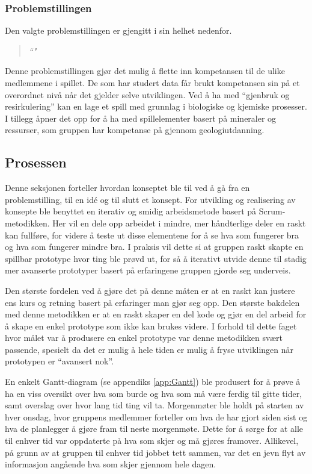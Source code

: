\subsubsection{Problemstillingen}
Den valgte problemstillingen er gjengitt i sin helhet nedenfor.
\begin{quotation}
\large\emph{``"}
\end{quotation}
Denne problemstillingen gjør det mulig å flette inn kompetansen til de
ulike medlemmene i spillet. De som har studert data får brukt
kompetansen sin på et overordnet nivå når det gjelder selve utviklingen.
Ved å ha med ``gjenbruk og resirkulering'' kan en lage et spill med
grunnlag i biologiske og kjemiske prosesser. I tillegg åpner det opp for å
ha med spillelementer basert på mineraler og ressurser, som gruppen har
kompetanse på gjennom geologiutdanning.



\subsection{Prosessen}
Denne seksjonen forteller hvordan konseptet ble til ved å gå fra en problemstilling, til en idé og til slutt et konsept. For utvikling og realisering av konsepte ble benyttet en iterativ og smidig arbeidsmetode\cite{online:agile_manifesto} basert på Scrum-metodikken\cite{Scrum}. Her vil en dele opp arbeidet i mindre, mer håndterlige deler en raskt kan fullføre, for videre å teste ut disse elementene for å se hva som fungerer bra og hva som fungerer mindre bra. I praksis vil dette si at gruppen raskt skapte en spillbar prototype hvor ting ble prøvd ut, for så å iterativt utvide denne til stadig mer avanserte prototyper basert på erfaringene gruppen gjorde seg underveis.

Den største fordelen ved å gjøre det på denne måten er at en raskt kan justere ens kurs og retning basert på erfaringer man gjør seg opp. 
Den største bakdelen med denne metodikken er at en raskt skaper en del kode og gjør en del arbeid for å skape en enkel prototype som ikke kan brukes videre.
I forhold til dette faget hvor målet var å produsere en enkel prototype var denne metodikken svært passende, spesielt da det er mulig å hele tiden er mulig å fryse utviklingen når prototypen er ``avansert nok''.


En enkelt Gantt-diagram (se appendiks \ref{app:Gantt}) ble produsert for å prøve å ha en viss oversikt over hva som burde og hva som må være ferdig til gitte tider, samt overslag over hvor lang tid ting vil ta.
Morgenmøter ble holdt på starten av hver onsdag, hvor gruppens medlemmer forteller om hva de har gjort siden sist og hva de planlegger å gjøre fram til neste morgenmøte. Dette for å sørge for at alle til enhver tid var oppdaterte på hva som skjer og må gjøres framover.
Allikevel, på grunn av at gruppen til enhver tid jobbet tett sammen, var det en jevn flyt av informasjon angående hva som skjer gjennom hele dagen.



